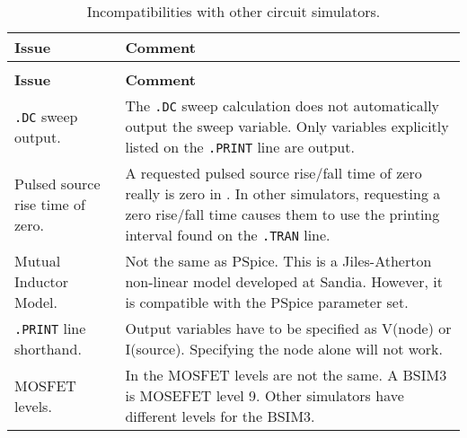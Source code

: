 


\small

\begin{longtable}[h] {>{\raggedright\small}m{2in}|>{\raggedright\let\\\tabularnewline\small}m{3.5in}}
  \caption{Incompatibilities with other circuit simulators.} \\ \hline
  \rowcolor{XyceDarkBlue}
  \color{white}\bf Issue &
  \color{white}\bf Comment
  \\ \hline
  \endfirsthead
  \caption[]{Incompatibilities with other circuit simulators.} \\ \hline
  \rowcolor{XyceDarkBlue}
  \color{white}\bf Issue &
  \color{white}\bf Comment
  \\ \hline
  \endhead

    \texttt{.DC} sweep output. & The \texttt{.DC} sweep calculation does not
    automatically output the sweep variable.  Only variables explicitly listed on
    the \texttt{.PRINT} line are output.\\ \hline

    Pulsed source rise time of zero. & A requested pulsed source rise/fall
    time of zero really is zero in \Xyce{}.  In other simulators, requesting a
    zero rise/fall time causes them to use the printing interval found on
    the \texttt{.TRAN} line.\\ \hline

    Mutual Inductor Model. & Not the same as PSpice.  This is a Jiles-Atherton non-linear
    model developed at Sandia. However, it is compatible with the PSpice parameter set.\\ \hline

    \texttt{.PRINT} line shorthand. & Output variables have to be specified
    as V(node) or I(source).  Specifying the node alone will not work.  \\ \hline

    MOSFET levels. & In \Xyce{} the MOSFET levels are not the same. A BSIM3 is MOSEFET level 9.  Other simulators have
    different levels for the BSIM3. \\ \hline


\end{longtable}
